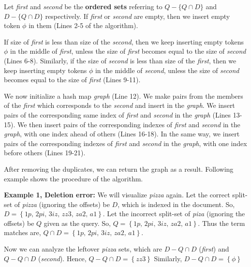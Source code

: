 	
	
	Let \textit{first} and \textit{second} be the \textbf{ordered sets} referring to $Q - \lbrace Q \cap D \rbrace$ and $D - \lbrace Q \cap D \rbrace$ respectively.
	If \textit{first} or \textit{second} are empty, then we insert empty token $\phi$ in them (Lines 2-5 of the algorithm).
	
	
	If size of \textit{first} is less than size of the \textit{second}, then we keep inserting empty tokens $\phi$ in the middle of \textit{first}, unless the size of \textit{first} becomes equal to the size of \textit{second} (Lines 6-8).
	Similarly, if the size of \textit{second} is less than size of the \textit{first}, then we keep inserting empty tokens $\phi$ in the middle of \textit{second}, unless the size of \textit{second} becomes equal to the size of \textit{first} (Lines 9-11).
	
	We now initialize a hash map \textit{graph} (Line 12).
	We make pairs from the members of the \textit{first} which corresponds to the \textit{second} and insert in the \textit{graph}.
	We insert pairs of the corresponding same index of \textit{first} and \textit{second} in the \textit{graph} (Lines 13-15).
	We then insert pairs of the corresponding indexes of \textit{first} and \textit{second} in the \textit{graph}, with one index ahead of others (Lines 16-18).
	In the same way, we insert pairs of the corresponding indexes of \textit{first} and \textit{second} in the \textit{graph}, with one index before others (Lines 19-21).
	
	After removing the duplicates, we can return the graph as a result. Following example shows the procedure of the algorithm.
	
	\textbf{Example 1, Deletion error:} We will visualize \textit{pizza} again. 
	Let the correct split-set of \textit{pizza} (ignoring the offsets) be $D$, which is indexed in the document.
	So, $D = \left\lbrace \textit{1p, 2pi, 3iz, zz3, za2, a1} \right\rbrace$.
	Let the incorrect split-set of \textit{piza} (ignoring the offsets) be $Q$ given as the query.
	So, $Q = \left\lbrace \textit{1p, 2pi, 3iz, za2, a1} \right\rbrace$.
	Thus the term matches are, 
	$Q \cap D = \left\lbrace \textit{1p, 2pi, 3iz, za2, a1} \right\rbrace$.
	
	Now we can analyze the leftover \textit{pizza} sets, which are $D - Q \cap D$ (\textit{first}) and $Q - Q \cap D$ (\textit{second}).
	Hence, $Q - Q \cap D = \left\lbrace \textit{zz3} \right\rbrace$
	Similarly, $D - Q \cap D = \left\lbrace \phi \right\rbrace$
	
